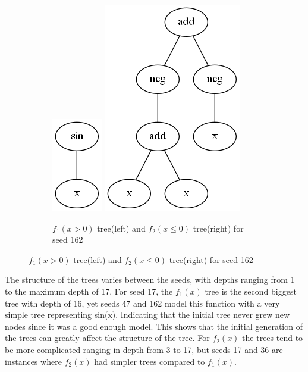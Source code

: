 \documentclass{article}
\begin{document}
\begin{figure}[h!]
	\centering
	\begin{subfigure}[b]{\linewidth}
		\includegraphics[width=0.5\linewidth]{ccgp_best_tree_162_1.png}
		\includegraphics[width=0.5\linewidth]{ccgp_best_tree_162_2.png}
		\caption{$f_1(x > 0)$ tree(left) and $f_2(x \le 0)$ tree(right) for seed 162}
	\end{subfigure}
\end{figure}
\clearpage
\noindent The structure of the trees varies between the seeds, with depths ranging from 1 to the maximum depth of 17. For seed 17, the $f_1(x)$ tree is the second biggest tree with depth of 16, yet seeds 47 and 162 model this function with a very simple tree representing sin(x). Indicating that the initial tree never grew new nodes since it was a good enough model. This shows that the initial generation of the trees can greatly affect the structure of the tree. For $f_2(x)$ the trees tend to be more complicated ranging in depth from 3 to 17, but seeds 17 and 36 are instances where $f_2(x)$ had simpler trees compared to $f_1(x)$. \par
\end{document}
